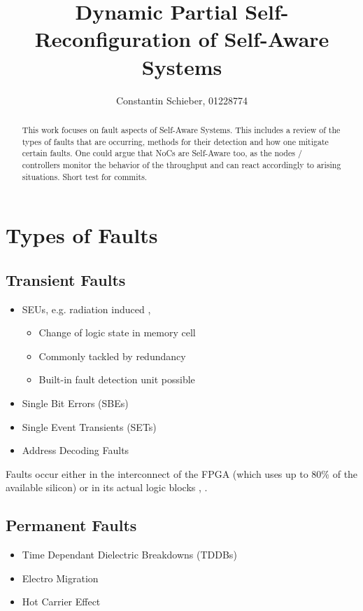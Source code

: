 \documentclass[10pt, journal]{IEEEtran}
\title{Dynamic Partial Self-Reconfiguration of Self-Aware Systems}
\author{Constantin Schieber, 01228774}
\begin{document}
\maketitle

\begin{abstract}
    This work focuses on fault aspects of Self-Aware Systems.
    This includes a review of the types of faults that are occurring, methods for their detection and how one mitigate certain faults. 
    One could argue that \glspl{NoC} are Self-Aware too, as the nodes / controllers monitor the behavior of the throughput and can react accordingly to arising situations.
	Short test for commits.
\end{abstract}

\section{Types of Faults}
\subsection{Transient Faults}
\begin{itemize}
    \item \glspl{SEU}, e.g. radiation induced \cite{alkady_fault-tolerant_2014}, \cite{lee_fault-tolerant_2017}
    \begin{itemize}
    \item Change of logic state in memory cell
    \item Commonly tackled by redundancy
    \item Built-in fault detection unit possible
    \end{itemize}
    \item Single Bit Errors (SBEs)
    \item Single Event Transients (SETs)
    \item Address Decoding Faults
\end{itemize}

Faults occur either in the interconnect of the \gls{FPGA} (which uses up to 80\% of the available silicon) or in its actual logic blocks \cite{alkady_fault-tolerant_2014}, \cite{jing_huang_routability_2004}.
\subsection{Permanent Faults}
\begin{itemize}
    \item Time Dependant Dielectric Breakdowns (TDDBs)
    \item Electro Migration
    \item Hot Carrier Effect
\end{itemize}
\end{document}
